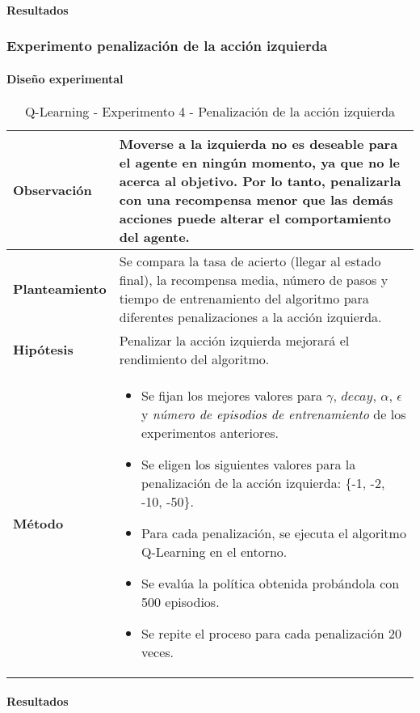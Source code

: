 \paragraph{Resultados}

\subsubsection{Experimento penalización de la acción izquierda}

\paragraph{Diseño experimental}

\begin{table}[H]
    \centering
    \begin{tabularx}{\textwidth}{|p{4cm}|X|} %
        \hline %
        \textbf{Observación} & Moverse a la izquierda no es deseable para el agente en ningún momento, ya que no le acerca al objetivo. Por lo tanto, penalizarla con una recompensa menor que las demás acciones puede alterar el comportamiento del agente.
        \\ \hline 
        \textbf{Planteamiento} & Se compara la tasa de acierto (llegar al estado final), la recompensa media, número de pasos y tiempo de entrenamiento del algoritmo para diferentes penalizaciones a la acción izquierda.
        \\ \hline
        \textbf{Hipótesis} & Penalizar la acción izquierda mejorará el rendimiento del algoritmo.
        \\ \hline
        \textbf{Método} &
        \begin{itemize}
            \item Se fijan los mejores valores para \(\gamma\), $decay$, \(\alpha\), \(\epsilon\) y \textit{número de episodios de entrenamiento} de los experimentos anteriores.
            \item Se eligen los siguientes valores para la penalización de la acción izquierda: \{-1, -2, -10, -50\}.
            \item Para cada penalización, se ejecuta el algoritmo Q-Learning en el entorno.
            \item Se evalúa la política obtenida probándola con 500 episodios.
            \item Se repite el proceso para cada penalización 20 veces.
        \end{itemize}
        \\ \hline
    \end{tabularx}
    \caption{Q-Learning - Experimento 4 - Penalización de la acción izquierda}
    \label{tab:diseñoQLEarningExp4}
\end{table}

\paragraph{Resultados}